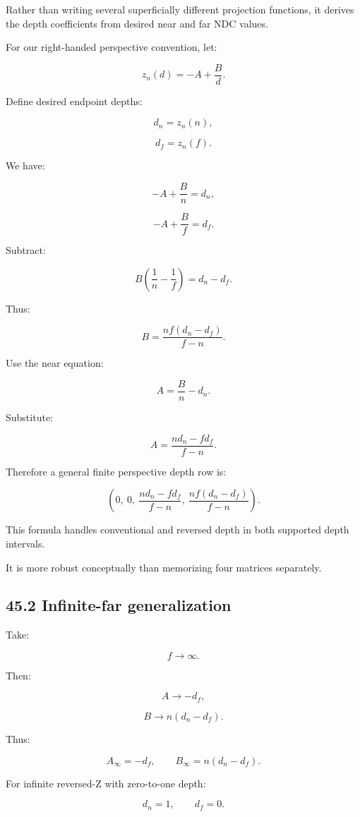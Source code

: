Rather than writing several superficially different projection functions, it derives the depth coefficients from desired near and far NDC values.

For our right-handed perspective convention, let:

\[
 z_n(d)=-A+\frac Bd.
\]

Define desired endpoint depths:

\[
 d_n=z_n(n),
\]

\[
 d_f=z_n(f).
\]

We have:

\[
 -A+\frac Bn=d_n,
\]

\[
 -A+\frac Bf=d_f.
\]

Subtract:

\[
 B\left(\frac1n-\frac1f\right)=d_n-d_f.
\]

Thus:

\[
 \boxed{ B=\frac{nf(d_n-d_f)}{f-n} }.
\]

Use the near equation:

\[
 A=\frac Bn-d_n.
\]

Substitute:

\[
 \boxed{ A=\frac{nd_n-fd_f}{f-n} }.
\]

Therefore a general finite perspective depth row is:

\[
 \boxed{ \left( 0,\ 0,\ \frac{nd_n-fd_f}{f-n},\ \frac{nf(d_n-d_f)}{f-n} \right) }.
\]

This formula handles conventional and reversed depth in both supported depth intervals.

It is more robust conceptually than memorizing four matrices separately.

\subsection{45.2 Infinite-far generalization}\label{02-foundations-ii-ch037-infinite-far-generalization}

Take:

\[
 f\to\infty.
\]

Then:

\[
 A\to-d_f,
\]

\[
 B\to n(d_n-d_f).
\]

Thus:

\[
 \boxed{ A_{\infty}=-d_f, \qquad B_{\infty}=n(d_n-d_f) }.
\]

For infinite reversed-Z with zero-to-one depth:

\[
 d_n=1,\qquad d_f=0.
\]

